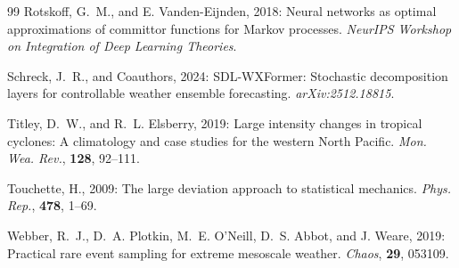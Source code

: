 \documentclass[11pt]{article}
\begin{document}
\begin{thebibliography}{99}
Rotskoff, G.~M., and E. Vanden-Eijnden, 2018: Neural networks as optimal approximations of committor functions for Markov processes. \textit{NeurIPS Workshop on Integration of Deep Learning Theories}.

Schreck, J.~R., and Coauthors, 2024: SDL-WXFormer: Stochastic decomposition layers for controllable weather ensemble forecasting. \textit{arXiv:2512.18815}.

Titley, D.~W., and R.~L. Elsberry, 2019: Large intensity changes in tropical cyclones: A climatology and case studies for the western North Pacific. \textit{Mon. Wea. Rev.}, \textbf{128}, 92--111.

Touchette, H., 2009: The large deviation approach to statistical mechanics. \textit{Phys. Rep.}, \textbf{478}, 1--69.

Webber, R.~J., D.~A. Plotkin, M.~E. O'Neill, D.~S. Abbot, and J. Weare, 2019: Practical rare event sampling for extreme mesoscale weather. \textit{Chaos}, \textbf{29}, 053109.

\end{thebibliography}
\end{document}
